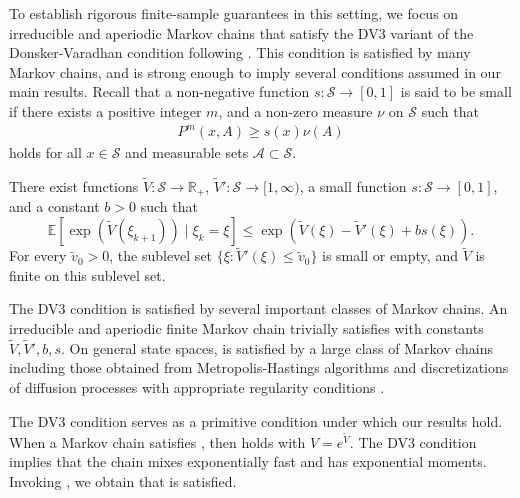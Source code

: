 \documentclass[11pt]{article}
\begin{document}
To establish rigorous finite-sample guarantees in this setting, we focus on irreducible and aperiodic Markov chains that satisfy the DV3 variant of the Donsker-Varadhan condition following \citep{borkar25}. 
This condition is satisfied by many Markov chains, and is strong enough to imply several conditions assumed in our main results. 
Recall that a non-negative function $s: \mathcal{S} \to [0, 1]$ is said to be small if there exists a positive integer $m$, and a non-zero measure $\nu$ on $\mathcal{S}$ such that 
\begin{align*}
    P^m (x, A) \geq s(x) \nu(A) 
\end{align*}
holds for all $x \in \mathcal{S}$ and measurable sets $\mathcal{A} \subset \mathcal{S}$. 
\begin{dv3}\label{ass:DV3}
    There exist functions $\tilde{V}: \mathcal{S} \to \mathbb{R}_+$, $\tilde{V}': \mathcal{S} \to [1, \infty)$, a small function $s: \mathcal{S} \to [0, 1]$, and a constant $b > 0$ such that
    \begin{equation}
        \mathbb{E}\left[\exp(\tilde{V}(\xi_{k+1})) \mid \xi_k = \xi\right] \leq \exp(\tilde{V}(\xi) - \tilde{V}'(\xi) + b s(\xi)).
    \end{equation}
    For every $\tilde{v}_0 > 0$, the sublevel set $\{\xi: \tilde{V}'(\xi) \leq \tilde{v}_0\}$ is small or empty, and $\tilde{V}$ is finite on this sublevel set. 
\end{dv3}
The DV3 condition is satisfied by several important classes of Markov chains.
An irreducible and aperiodic finite Markov chain trivially satisfies  with constants $\tilde{V}, \tilde{V}', b, s$. 
On general state spaces,  is satisfied by a large class of Markov chains including those obtained from Metropolis-Hastings algorithms \citep{roberts1996geometric,mengersen96,JARNER2000341} and discretizations of diffusion processes with appropriate regularity conditions \citep{mattingly2002ergodicity,cattiaux2010note}. 




The DV3 condition serves as a primitive condition under which our results hold. 
When a Markov chain satisfies , then  holds with $V = e^{\tilde{V}}$. 
The DV3 condition implies that the chain mixes exponentially fast and has exponential moments. 
Invoking \citep[Theorem 3]{srikant2024CLT}, we obtain that  is satisfied. 
\end{document}
